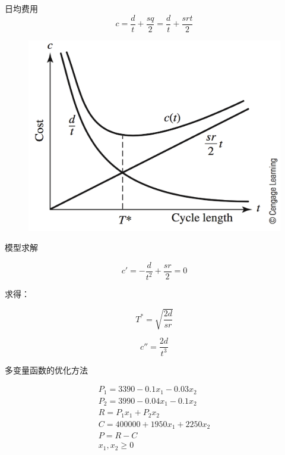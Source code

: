 \documentclass[UTF8]{ctexbeamer}
\begin{document}
\begin{frame}{日均费用}
  \[
    c = \frac{d}{t} + \frac{s q}{2} = \frac{d}{t} + \frac{s r t}{2}
  \]

  \begin{figure}
    \centering
    \includegraphics[width=.6\textwidth{}]{13_4.png}
  \end{figure}
\end{frame}

\begin{frame}{模型求解}

  \[
    c' = -\frac{d}{t^2} + \frac{s r}{2} = 0
  \]

  求得：

  \[
    T^\ast = \sqrt{ \frac{2 d}{s r} }
  \]

  \[
    c'' = \frac{2 d}{t^3}
  \]
  
\end{frame}

\begin{frame}{多变量函数的优化方法}

  \begin{gather*}
    P_1 = 3390 - 0.1 x_1 - 0.03 x_2\\
    P_2 = 3990 - 0.04 x_1 - 0.1 x_2\\
    R = P_1 x_1 + P_2 x_2\\
    C = 400000 + 1950 x_1 + 2250 x_2\\
    P = R - C\\
    x_1, x_2 \ge 0
  \end{gather*}
  
  
\end{frame}
\end{document}
